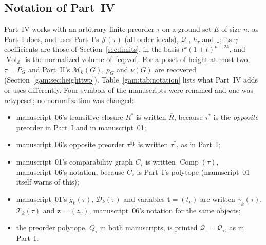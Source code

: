 \documentclass[11pt]{article}
\numberwithin{equation}{section}
\theoremstyle{definition}
\newcommand{\Z}{\mathbb Z}
\newcommand{\J}{\mathcal J(\tau)}
\newcommand{\Qt}{\mathcal Q_\tau}
\newcommand{\Vol}{\operatorname{Vol}_{\Z}}
\newcommand{\down}{\mathord\downarrow}
\newcommand{\PM}{\mathcal M}
\newcommand{\zv}{\mathbf z}
\newcommand{\Tset}{\mathcal T}
\newcommand{\Comp}{\operatorname{Comp}}
\begin{document}
\subsection{Notation of Part~IV}
\label{gam:sec:notation}
Part~IV works with an arbitrary finite preorder $\tau$ on a ground set $E$
of size $n$, as Part~I does, and uses Part~I's $\J$ (all order ideals),
$\Qt$, $h_\tau$ and $\down$; its $\gamma$-coefficients are those of
Section~\ref{sec:limits}, in the basis $t^k(1+t)^{n-2k}$, and $\Vol$ is the
normalized volume of~\eqref{eq:vol}. For a poset of height at most two,
$\tau=P_G$ and Part~II's $\PM_k(G)$, $p_G$ and $\nu(G)$ are recovered
(Section~\ref{gam:sec:heighttwo}). Table~\ref{gam:tab:notation} lists what
Part~IV adds or uses differently. Four symbols of the manuscripts were
renamed and one was retypeset; no normalization was changed:
\begin{itemize}[leftmargin=1.4em]
\item manuscript~06's transitive closure $R^*$ is written $\overline R$,
because $\tau^*$ is the \emph{opposite} preorder in Part~I and in
manuscript~01;
\item manuscript~06's opposite preorder $\tau^{\mathrm{op}}$ is written
$\tau^*$, as in Part~I;
\item manuscript~01's comparability graph $C_\tau$ is written $\Comp(\tau)$,
manuscript~06's notation, because $C_\tau$ is Part~I's polytope
(manuscript~01 itself warns of this);
\item manuscript~01's $g_k(\tau)$, $\mathcal D_k(\tau)$ and variables
$\mathbf t=(t_v)$ are written $\gamma_k(\tau)$, $\Tset_k(\tau)$ and
$\zv=(z_v)$, manuscript~06's notation for the same objects;
\item the preorder polytope, $Q_\tau$ in both manuscripts, is printed
$\Qt=\mathcal Q_\tau$, as in Part~I.
\end{itemize}
\end{document}
